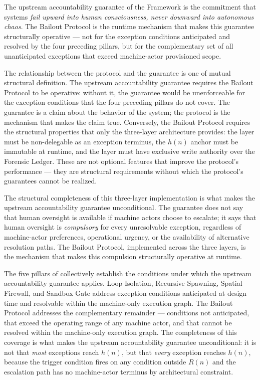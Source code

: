 The upstream accountability guarantee of the \bxthree{} Framework is the commitment that \bxthree{} systems \emph{fail upward into human consciousness, never downward into autonomous chaos}. The Bailout Protocol is the runtime mechanism that makes this guarantee structurally operative — not for the exception conditions anticipated and resolved by the four preceding pillars, but for the complementary set of all unanticipated exceptions that exceed machine-actor provisioned scope.

The relationship between the protocol and the guarantee is one of mutual structural definition. The upstream accountability guarantee requires the Bailout Protocol to be operative: without it, the guarantee would be unenforceable for the exception conditions that the four preceding pillars do not cover. The guarantee is a claim about the behavior of the system; the protocol is the mechanism that makes the claim true. Conversely, the Bailout Protocol requires the structural properties that only the \bxthree{} three-layer architecture provides: the \purpose{} layer must be non-delegable as an exception terminus, the $h(n)$ anchor must be immutable at runtime, and the \fact{} layer must have exclusive write authority over the Forensic Ledger. These are not optional features that improve the protocol's performance — they are structural requirements without which the protocol's guarantees cannot be realized.

The structural completeness of this three-layer implementation is what makes the upstream accountability guarantee unconditional. The guarantee does not say that human oversight is available if machine actors choose to escalate; it says that human oversight is \emph{compulsory} for every unresolvable exception, regardless of machine-actor preferences, operational urgency, or the availability of alternative resolution paths. The Bailout Protocol, implemented across the three \bxthree{} layers, is the mechanism that makes this compulsion structurally operative at runtime.

The five pillars of \bxthree{} collectively establish the conditions under which the upstream accountability guarantee applies. Loop Isolation, Recursive Spawning, Spatial Firewall, and Sandbox Gate address exception conditions anticipated at design time and resolvable within the machine-only execution graph. The Bailout Protocol addresses the complementary remainder — conditions not anticipated, that exceed the operating range of any machine actor, and that cannot be resolved within the machine-only execution graph. The completeness of this coverage is what makes the upstream accountability guarantee unconditional: it is not that \emph{most} exceptions reach $h(n)$, but that \emph{every} exception reaches $h(n)$, because the trigger condition fires on any condition outside $R(n)$ and the escalation path has no machine-actor terminus by architectural constraint.

